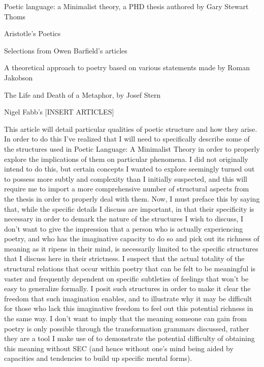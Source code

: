 \documentclass[]{article}
\begin{document}
Poetic language: a Minimalist theory, a PHD thesis authored by Gary Stewart Thoms

Aristotle's Poetics

Selections from Owen Barfield's articles

A theoretical approach to poetry based on various statements made by Roman Jakobson

The Life and Death of a Metaphor, by Josef Stern

Nigel Fabb's [INSERT ARTICLES]



This article will detail particular qualities of poetic structure and how they arise. In order to do this I've realized that I will need to specifically describe some of the structures used in Poetic Language: A Minimalist Theory in order to properly explore the implications of them on particular phenomena. I did not originally intend to do this, but certain concepts I wanted to explore seemingly turned out to possess more subtly and complexity than I initially suspected, and this will require me to import a more comprehensive number of structural aspects from the thesis in order to properly deal with them. Now, I must preface this by saying that, while the specific details I discuss are important, in that their specificity is necessary in order to demark the nature of the structures I wish to discuss, I don't want to give the impression that a person who is actually experiencing poetry, and who has the imaginative capacity to do so and pick out its richness of meaning as it ripens in their mind, is necessarily limited to the specific structures that I discuss here in their strictness. I suspect that the actual totality of the structural relations that occur within poetry that can be felt to be meaningful is vaster and frequently dependent on specific subtleties of feelings that won't be easy to generalize formally. I posit such structures in order to make it clear the freedom that such imagination enables, and to illustrate why it may be difficult for those who lack this imaginative freedom to feel out this potential richness in the same way. I don't want to imply that the meaning someone can gain from poetry is only possible through the transformation grammars discussed, rather they are a tool I make use of to demonstrate the potential difficulty of obtaining this meaning without SEC (and hence without one's mind being aided by capacities and tendencies to build up specific mental forms).
\end{document}
